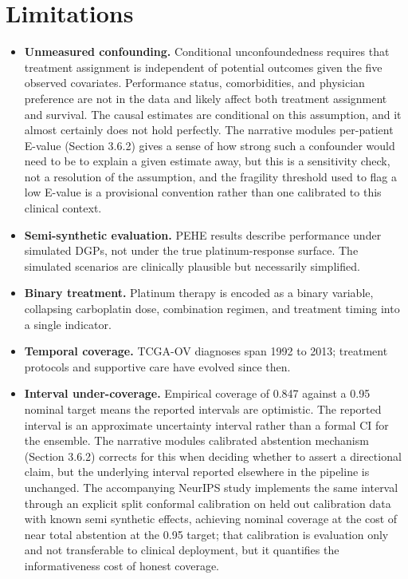 \section{Limitations}\label{limitations}

\begin{itemize}
\item
 \textbf{Unmeasured confounding.} Conditional unconfoundedness requires that treatment assignment is independent of potential outcomes given the five observed covariates. Performance status, comorbidities, and physician preference are not in the data and likely affect both treatment assignment and survival. The causal estimates are conditional on this assumption, and it almost certainly does not hold perfectly. The narrative module\textquotesingle s per-patient E-value (Section 3.6.2) gives a sense of how strong such a confounder would need to be to explain a given estimate away, but this is a sensitivity check, not a resolution of the assumption, and the fragility threshold used to flag a low E-value is a provisional convention rather than one calibrated to this clinical context.
\item
 \textbf{Semi-synthetic evaluation.} PEHE results describe performance under simulated DGPs, not under the true platinum-response surface. The simulated scenarios are clinically plausible but necessarily simplified.
\item
 \textbf{Binary treatment.} Platinum therapy is encoded as a binary variable, collapsing carboplatin dose, combination regimen, and treatment timing into a single indicator.
\item
 \textbf{Temporal coverage.} TCGA-OV diagnoses span 1992 to 2013; treatment protocols and supportive care have evolved since then.
\item
 \textbf{Interval under-coverage.} Empirical coverage of 0.847 against a 0.95 nominal target means the reported intervals are optimistic. The reported interval is an approximate uncertainty interval rather than a formal CI for the ensemble. The narrative module\textquotesingle s calibrated abstention mechanism (Section 3.6.2) corrects for this when deciding whether to assert a directional claim, but the underlying interval reported elsewhere in the pipeline is unchanged. The accompanying NeurIPS study implements the same interval through an explicit split conformal calibration on held out calibration data with known semi synthetic effects, achieving nominal coverage at the cost of near total abstention at the 0.95 target; that calibration is evaluation only and not transferable to clinical deployment, but it quantifies the informativeness cost of honest coverage.

\end{itemize}
